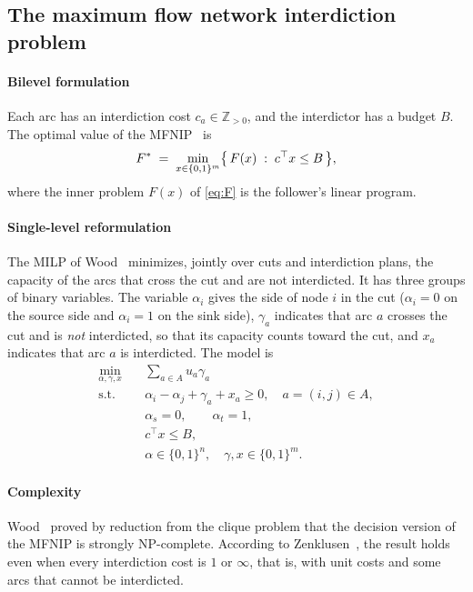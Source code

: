 \subsection{The maximum flow network interdiction problem}\label{sec:bg-mfnip}

\paragraph{Bilevel formulation} Each arc has an interdiction cost $c_a\in\mathbb{Z}_{>0}$, and the interdictor has a budget $B$. The optimal value of the MFNIP~\cite{wood1993,smith2020} is
\begin{equation}\label{eq:mfnip}
  F^{*} \;=\; \min_{x\in\{0,1\}^{m}} \bigl\{\, F(x) \;:\; c^{\top}x\le B \,\bigr\},
\end{equation}
where the inner problem $F(x)$ of \eqref{eq:F} is the follower's linear program.

\paragraph{Single-level reformulation} The MILP of Wood~\cite{wood1993} minimizes, jointly over cuts and interdiction plans, the capacity of the arcs that cross the cut and are not interdicted. It has three groups of binary variables. The variable $\alpha_i$ gives the side of node $i$ in the cut ($\alpha_i=0$ on the source side and $\alpha_i=1$ on the sink side), $\gamma_a$ indicates that arc $a$ crosses the cut and is \emph{not} interdicted, so that its capacity counts toward the cut, and $x_a$ indicates that arc $a$ is interdicted. The model is
\begin{equation}\label{eq:milp}
\begin{aligned}
  \min_{\alpha,\gamma,x}\quad & \sum_{a\in A} u_a\gamma_a \\
  \text{s.t.}\quad & \alpha_i-\alpha_j+\gamma_a+x_a \ge 0,\quad a=(i,j)\in A,\\
  & \alpha_s=0,\qquad \alpha_t=1, \\
  & c^{\top}x\le B, \\
  & \alpha\in\{0,1\}^{n},\quad \gamma,x\in\{0,1\}^{m}.
\end{aligned}
\end{equation}

\paragraph{Complexity} Wood~\cite{wood1993} proved by reduction from the clique problem that the decision version of the MFNIP is strongly NP-complete. According to Zenklusen~\cite{zenklusen2010}, the result holds even when every interdiction cost is $1$ or $\infty$, that is, with unit costs and some arcs that cannot be interdicted.

